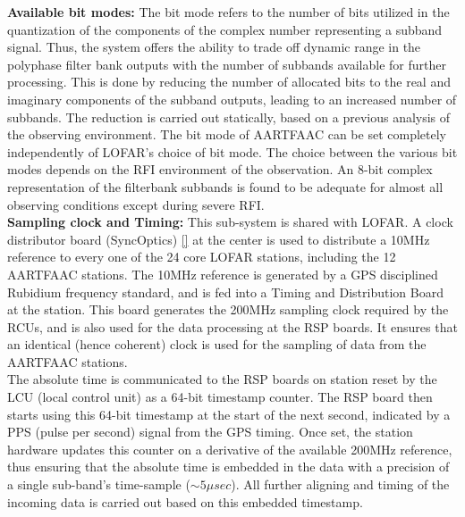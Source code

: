 \documentclass{ws-jai}
\begin{document}
\noindent \textbf  {Available bit modes:} The  bit mode refers to  the number of
bits  utilized in  the  quantization of  the components  of  the complex  number
representing a subband signal.  Thus, the system offers the ability to trade off
dynamic range in  the polyphase filter bank outputs with  the number of subbands
available  for further  processing.   This is  done by  reducing  the number  of
allocated bits  to the  real and  imaginary components  of the  subband outputs,
leading  to an  increased  number of  subbands.  The  reduction  is carried  out
statically, based on a previous analysis  of the observing environment.  The bit
mode of  AARTFAAC can be set  completely independently of LOFAR's  choice of bit
mode. The choice between the various bit modes depends on the RFI environment of
the observation.  An 8-bit complex  representation of the filterbank subbands is
found to  be adequate for almost  all observing conditions except  during severe
RFI.\\


\noindent \textbf  {Sampling clock and  Timing:} This sub-system is  shared with
LOFAR. A  clock distributor board (SyncOptics)  \ref{} at the center  is used to
distribute  a 10MHz  reference  to every  one  of the  24  core LOFAR  stations,
including the 12  AARTFAAC stations.  The 10MHz reference is  generated by a GPS
disciplined  Rubidium  frequency   standard,  and  is  fed  into   a  Timing  and
Distribution  Board at  the station.  This board  generates the  200MHz sampling
clock required by the RCUs, and is also  used for the data processing at the RSP
boards. It  ensures that  an identical  (hence coherent) clock  is used  for the
sampling of data from the AARTFAAC stations.\\

The absolute time is communicated to the  RSP boards on station reset by the LCU
(local control  unit) as a 64-bit  timestamp counter. The RSP  board then starts
using this 64-bit timestamp at the start  of the next second, indicated by a PPS
(pulse per second)  signal from the GPS timing.  Once  set, the station hardware
updates  this counter  on a  derivative of  the available  200MHz reference,  thus
ensuring that the  absolute time is embedded  in the data with a  precision of a
single sub-band's time-sample ($\sim5\mu sec$). All  further aligning and timing of
the incoming data is carried out based on this embedded timestamp.\\
\end{document}
